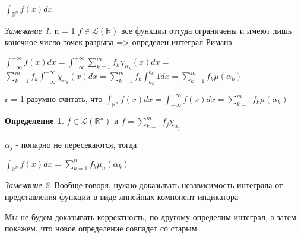 \documentclass[a4paper]{article}
\theoremstyle{definition}
\newtheorem*{definition}{Определение}
\theoremstyle{remark}
\newtheorem*{remark}{Замечание}
\begin{document}
$\int_{\mathbb{R}^n}f(x)dx$
\begin{remark}
     n = 1 $f\in \mathcal{L}(\mathbb{R})$ все функции оттуда ограничены и имеют лишь конечное число точек разрыва => определен интеграл Римана

     $\int_{-\infty}^{+\infty} f(x)dx = \int_{-\infty}^{+\infty}\sum_{k=1}^m f_k \chi_{\alpha_k}(x)dx =$
     $\sum_{k=1}^m f_k \int_{-\infty}^{+\infty}\chi_{\alpha_k}(x)dx = \sum_{k=1}^m f_k \int_{a_k}^{b_k}1dx = \sum_{k=1}^m f_k \mu(\alpha_k)$

     r = 1 разумно считать, что $\int_{\mathbb{R}^n}f(x)dx = \int_{-\infty}^{+\infty} f(x)dx =\sum_{k=1}^m f_k \mu(\alpha_k)$
\end{remark}
\begin{definition}
     $f\in\mathcal{L}(\mathbb{R} ^n)$ и $f = \sum_{k=1}^m f_j \chi_{\alpha_j}$

     $\alpha_j$ - попарно не пересекаются, тогда

     $\int_{\mathbb{R}^n}f(x)dx = \sum_{k=1}^n f_k \mu_n(\alpha_k)$
\end{definition}
\begin{remark}
     Вообще говоря, нужно доказывать независимость интеграла от представления функции в виде линейных компонент
     индикатора

     Мы не будем доказывать корректность, по-другому определим интеграл, а затем покажем, что новое определение совпадет со старым
\end{remark}
\end{document}
